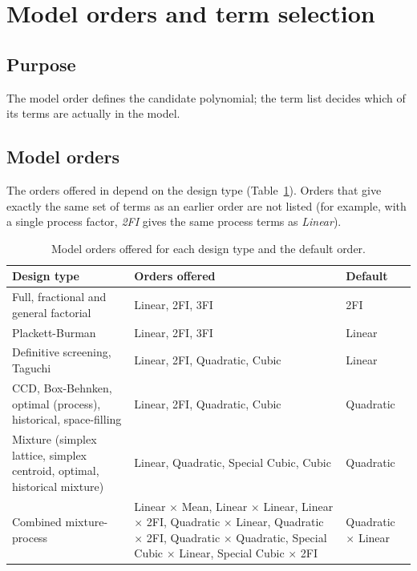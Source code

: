 \section{Model orders and term selection}\label{sec:ch05-terms}

\subsection*{Purpose}
The model order defines the candidate polynomial; the term list decides which of its terms are actually in
the model.

\subsection*{Model orders}
The orders offered in  depend on the design type (Table~\ref{tab:ch05-orders}). Orders that give
exactly the same set of terms as an earlier order are not listed (for example, with a single process
factor, \emph{2FI} gives the same process terms as \emph{Linear}).

\begin{table}[htbp]\centering\small
\caption{Model orders offered for each design type and the default order.}\label{tab:ch05-orders}
\begin{tabularx}{\linewidth}{@{}X X l@{}}
\toprule
Design type & Orders offered & Default \\
\midrule
Full, fractional and general factorial & Linear, 2FI, 3FI & 2FI \\
Plackett-Burman & Linear, 2FI, 3FI & Linear \\
Definitive screening, Taguchi & Linear, 2FI, Quadratic, Cubic & Linear \\
CCD, Box-Behnken, optimal (process), historical, space-filling & Linear, 2FI, Quadratic, Cubic & Quadratic \\
Mixture (simplex lattice, simplex centroid, optimal, historical mixture) & Linear, Quadratic, Special Cubic, Cubic & Quadratic \\
Combined mixture-process & Linear $\times$ Mean, Linear $\times$ Linear, Linear $\times$ 2FI, Quadratic $\times$ Linear, Quadratic $\times$ 2FI, Quadratic $\times$ Quadratic, Special Cubic $\times$ Linear, Special Cubic $\times$ 2FI & Quadratic $\times$ Linear \\
\bottomrule
\end{tabularx}
\end{table}

